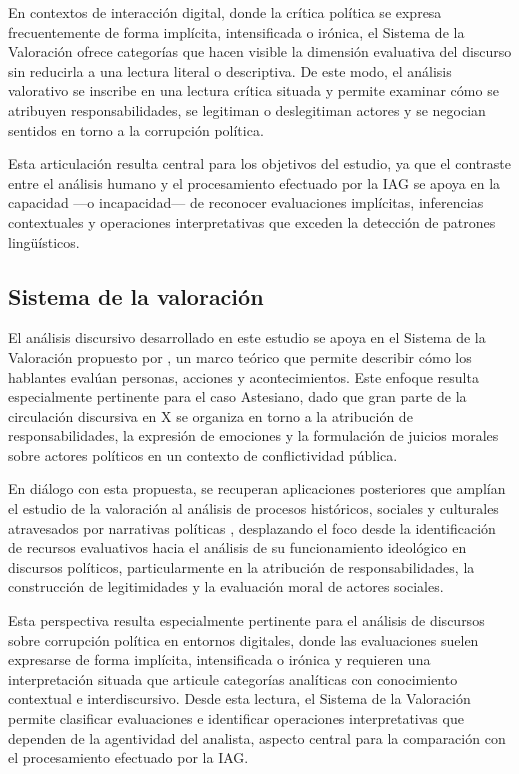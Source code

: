 \documentclass[spanish]{textolivre}
\begin{document}
En contextos de interacción digital, donde la crítica política se expresa frecuentemente de forma implícita, intensificada o irónica, el Sistema de la Valoración ofrece categorías que hacen visible la dimensión evaluativa del discurso sin reducirla a una lectura literal o descriptiva. De este modo, el análisis valorativo se inscribe en una lectura crítica situada y permite examinar cómo se atribuyen responsabilidades, se legitiman o deslegitiman actores y se negocian sentidos en torno a la corrupción política.

Esta articulación resulta central para los objetivos del estudio, ya que el contraste entre el análisis humano y el procesamiento efectuado por la IAG se apoya en la capacidad —o incapacidad— de reconocer evaluaciones implícitas, inferencias contextuales y operaciones interpretativas que exceden la detección de patrones lingüísticos.

\subsection{Sistema de la valoración}\label{sec-modelo}
El análisis discursivo desarrollado en este estudio se apoya en el Sistema de la Valoración propuesto por \textcite{martin2005language}, un marco teórico que permite describir cómo los hablantes evalúan personas, acciones y acontecimientos. Este enfoque resulta especialmente pertinente para el caso Astesiano, dado que gran parte de la circulación discursiva en X se organiza en torno a la atribución de responsabilidades, la expresión de emociones y la formulación de juicios morales sobre actores políticos en un contexto de conflictividad pública.

En diálogo con esta propuesta, se recuperan aplicaciones posteriores que amplían el estudio de la valoración al análisis de procesos históricos, sociales y culturales atravesados por narrativas políticas \cite{oteiza2019valoracion}, desplazando el foco desde la identificación de recursos evaluativos hacia el análisis de su funcionamiento ideológico en discursos políticos, particularmente en la atribución de responsabilidades, la construcción de legitimidades y la evaluación moral de actores sociales.

Esta perspectiva resulta especialmente pertinente para el análisis de discursos sobre corrupción política en entornos digitales, donde las evaluaciones suelen expresarse de forma implícita, intensificada o irónica y requieren una interpretación situada que articule categorías analíticas con conocimiento contextual e interdiscursivo. Desde esta lectura, el Sistema de la Valoración permite clasificar evaluaciones e identificar operaciones interpretativas que dependen de la agentividad del analista, aspecto central para la comparación con el procesamiento efectuado por la IAG.
\end{document}
